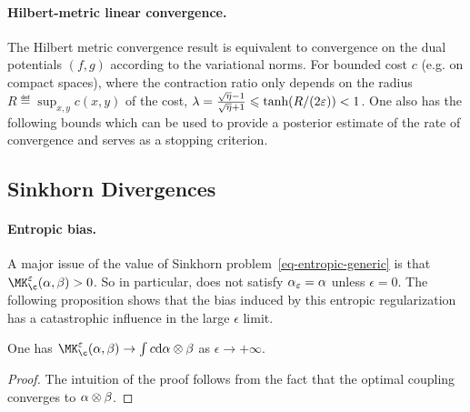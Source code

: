 \paragraph{Hilbert-metric linear convergence.}

The Hilbert metric convergence result is equivalent to convergence on the dual potentials $(f,g)$ according to the variational norms. For bounded cost $c$ (e.g. on compact spaces), 
where the contraction ratio only depends on the radius $R \eqdef \sup_{x,y} c(x,y)$ of the cost, $\lambda=\frac{\sqrt{\eta}-1}{\sqrt{\eta}+1} \leqslant \text{tanh}(R/(2\varepsilon)) < 1$. One also has the following bounds
which can be used to provide a posterior estimate of the rate of convergence and serves as a stopping criterion.

\subsection{Sinkhorn Divergences}
\label{sec-sinkhorn-div}


\paragraph{Entropic bias.}

A major issue of the value of Sinkhorn problem~\eqref{eq-entropic-generic} is that $\MK_\c^\epsilon(\al,\be)>0$. So in particular, 
\eq{
	\al_\epsilon = \uargmin{\be} \MK_\c^\epsilon(\al,\be)
}
does not satisfy $\alpha_\varepsilon=\alpha$ unless $\epsilon=0$. The following proposition shows that the bias induced by this entropic regularization has a catastrophic influence in the large $\epsilon$ limit.

\begin{prop}
	One has $\MK_\c^\epsilon(\al,\be) \rightarrow \int c \d\al \otimes \be$ as $\epsilon \rightarrow +\infty$.
\end{prop}
\begin{proof}	
	The intuition of the proof follows from the fact that the optimal coupling converges to $\alpha \otimes \beta$. 
\end{proof}

